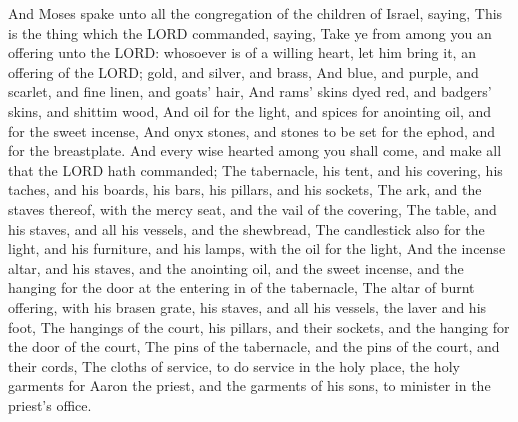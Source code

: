  And Moses spake unto all the congregation of the children
of Israel, saying, This is the thing which the LORD commanded, saying,
 Take ye from among you an offering unto the LORD:
whosoever is of a willing heart, let him bring it, an offering of the
LORD; gold, and silver, and brass,  And blue, and purple,
and scarlet, and fine linen, and goats' hair,  And rams'
skins dyed red, and badgers' skins, and shittim wood,  And
oil for the light, and spices for anointing oil, and for the sweet
incense,  And onyx stones, and stones to be set for the
ephod, and for the breastplate.  And every wise hearted
among you shall come, and make all that the LORD hath commanded;
 The tabernacle, his tent, and his covering, his taches,
and his boards, his bars, his pillars, and his sockets, 
The ark, and the staves thereof, with the mercy seat, and the vail of
the covering,  The table, and his staves, and all his
vessels, and the shewbread,  The candlestick also for the
light, and his furniture, and his lamps, with the oil for the light,
 And the incense altar, and his staves, and the anointing
oil, and the sweet incense, and the hanging for the door at the entering
in of the tabernacle,  The altar of burnt offering, with
his brasen grate, his staves, and all his vessels, the laver and his
foot,  The hangings of the court, his pillars, and their
sockets, and the hanging for the door of the court,  The
pins of the tabernacle, and the pins of the court, and their cords,
 The cloths of service, to do service in the holy place,
the holy garments for Aaron the priest, and the garments of his sons, to
minister in the priest's office.

